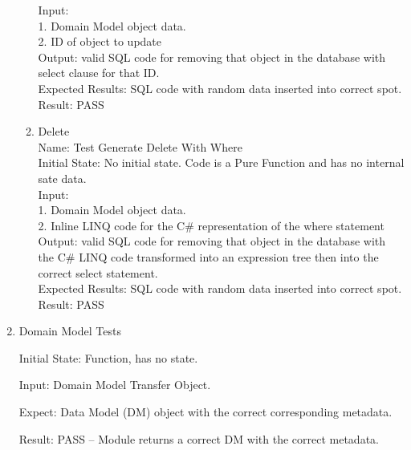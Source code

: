 \documentclass[12pt, titlepage]{article}
\begin{document}
\begin{enumerate}
\begin{enumerate}
				Input:\\
				1. Domain Model object data.\\
				2. ID of object to update\\

				Output: valid SQL code for removing that object in the database with
				select clause for that ID.\\

				Expected Results: SQL code with random data inserted into correct spot.\\

				Result: PASS

				\item Delete\\

				Name: Test Generate Delete With Where\\

				Initial State: No initial state. Code is a Pure Function and has no internal sate data.\\

				Input:\\
				1. Domain Model object data.\\
				2. Inline LINQ code for the C\# representation of the where statement\\

				Output: valid SQL code for removing that object in the database with
				the C\# LINQ code transformed into an expression tree then into the correct
				select statement.\\

				Expected Results: SQL code with random data inserted into correct spot.\\

				Result: PASS\\

			\end{enumerate}


      \item{Domain Model Tests\\} \label{dto}

      Initial State: Function, has no state.

      Input: Domain Model Transfer Object.

			Expect: Data Model (DM) object with the correct corresponding metadata.

			Result: PASS -- Module returns a correct DM with the correct metadata.

    \end{enumerate}
\end{document}

